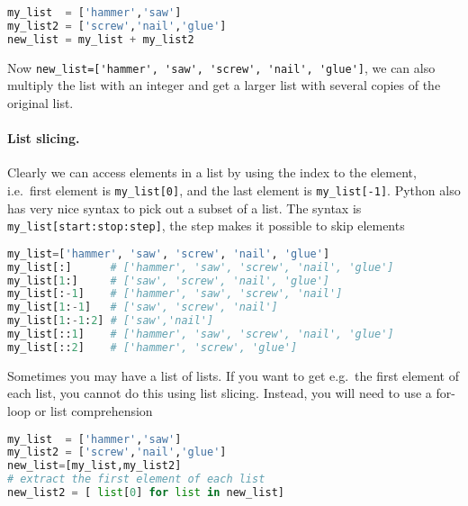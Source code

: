 \documentclass[graybox,sectrefs,envcountresetchap,open=right,final]{svmonodo}
\begin{document}
\begin{lstlisting}[language=python,style=blue1bar]
my_list  = ['hammer','saw']
my_list2 = ['screw','nail','glue']
new_list = my_list + my_list2

\end{lstlisting}

Now \Verb!new_list=['hammer', 'saw', 'screw', 'nail', 'glue']!, we can also multiply the list with an integer and get a larger list with several copies of the original list.

\paragraph{List slicing.}
Clearly we can access elements in a list by using the index to the element, i.e.~first element is \Verb!my_list[0]!, and the last element is \Verb!my_list[-1]!. Python also has very nice syntax to pick out a subset of a list. The syntax is \Verb!my_list[start:stop:step]!, the step makes it possible to skip elements









\begin{lstlisting}[language=python,style=blue1bar]
my_list=['hammer', 'saw', 'screw', 'nail', 'glue']
my_list[:]      # ['hammer', 'saw', 'screw', 'nail', 'glue']
my_list[1:]     # ['saw', 'screw', 'nail', 'glue']
my_list[:-1]    # ['hammer', 'saw', 'screw', 'nail']
my_list[1:-1]   # ['saw', 'screw', 'nail']
my_list[1:-1:2] # ['saw','nail']
my_list[::1]    # ['hammer', 'saw', 'screw', 'nail', 'glue']
my_list[::2]    # ['hammer', 'screw', 'glue']

\end{lstlisting}


Sometimes you may have a list of lists. If you want to get e.g.~the first element of each list, you cannot do this using list slicing. Instead, you will need to use a for-loop or list comprehension






\begin{lstlisting}[language=python,style=blue1bar]
my_list  = ['hammer','saw']
my_list2 = ['screw','nail','glue']
new_list=[my_list,my_list2]
# extract the first element of each list
new_list2 = [ list[0] for list in new_list]

\end{lstlisting}
\end{document}
